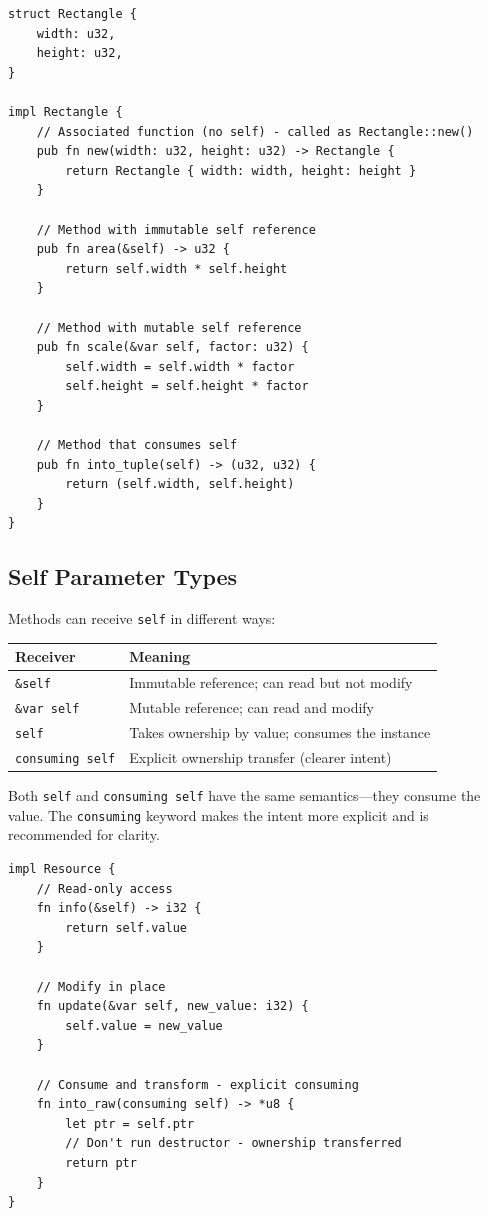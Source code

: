 \begin{lstlisting}
struct Rectangle {
    width: u32,
    height: u32,
}

impl Rectangle {
    // Associated function (no self) - called as Rectangle::new()
    pub fn new(width: u32, height: u32) -> Rectangle {
        return Rectangle { width: width, height: height }
    }

    // Method with immutable self reference
    pub fn area(&self) -> u32 {
        return self.width * self.height
    }

    // Method with mutable self reference
    pub fn scale(&var self, factor: u32) {
        self.width = self.width * factor
        self.height = self.height * factor
    }

    // Method that consumes self
    pub fn into_tuple(self) -> (u32, u32) {
        return (self.width, self.height)
    }
}
\end{lstlisting}

\subsection{Self Parameter Types}
\label{subsec:self-types}

Methods can receive \texttt{self} in different ways:

\begin{center}
\begin{tabular}{lp{8cm}}
\textbf{Receiver} & \textbf{Meaning} \\
\hline
\texttt{\&self} & Immutable reference; can read but not modify \\
\texttt{\&var self} & Mutable reference; can read and modify \\
\texttt{self} & Takes ownership by value; consumes the instance \\
\texttt{consuming self} & Explicit ownership transfer (clearer intent) \\
\end{tabular}
\end{center}

Both \texttt{self} and \texttt{consuming self} have the same semantics---they consume the value. The \texttt{consuming} keyword makes the intent more explicit and is recommended for clarity.

\begin{lstlisting}
impl Resource {
    // Read-only access
    fn info(&self) -> i32 {
        return self.value
    }

    // Modify in place
    fn update(&var self, new_value: i32) {
        self.value = new_value
    }

    // Consume and transform - explicit consuming
    fn into_raw(consuming self) -> *u8 {
        let ptr = self.ptr
        // Don't run destructor - ownership transferred
        return ptr
    }
}
\end{lstlisting}

